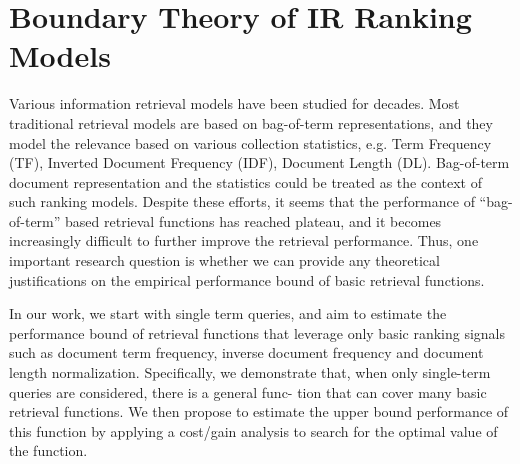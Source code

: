 %
%
\chapter{Boundary Theory of IR Ranking Models}

Various information retrieval models have been studied for decades. 
Most traditional retrieval models are based on bag-of-term 
representations, and they model the relevance based on various 
collection statistics, e.g. Term Frequency (TF), 
Inverted Document Frequency (IDF), Document Length (DL). 
Bag-of-term document representation and the statistics could be 
treated as the context of such ranking models.
Despite these efforts, it seems that the performance of 
``bag-of-term'' based retrieval functions has reached plateau, 
and it becomes increasingly difficult to further improve the retrieval 
performance. Thus, one important research question is whether 
we can provide any theoretical justifications on the empirical 
performance bound of basic retrieval functions. 

In our work, we start with single term queries, and aim to
estimate the performance bound of retrieval functions that
leverage only basic ranking signals such as document term
frequency, inverse document frequency and document length
normalization. Specifically, we demonstrate that, when only
single-term queries are considered, there is a general func-
tion that can cover many basic retrieval functions. We then
propose to estimate the upper bound performance of this
function by applying a cost/gain analysis to search for the
optimal value of the function.